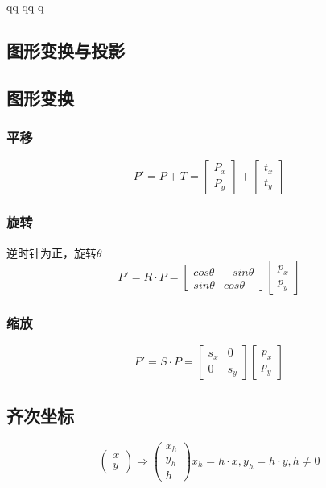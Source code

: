qq	qq	q                                                                                                                                                                                                                                                                                      \documentclass{article}
\begin{document}
\begin{CJK}{UTF8}{gbsn}
	\section{图形变换与投影}
	\subsection{图形变换}
	\subsubsection{平移}
	$$
	P'=P+T=\begin{bmatrix}
	P_x\\
	P_y\end{bmatrix}
	+\begin{bmatrix}
	t_x\\t_y
	\end{bmatrix}
	$$
	\subsubsection{旋转}
	逆时针为正，旋转$\theta$\\
	$$
	P'=R\cdot P=\begin{bmatrix}
	cos\theta&-sin\theta\\sin\theta&cos\theta
	\end{bmatrix}
	\begin{bmatrix}
	p_x\\p_y
	\end{bmatrix}
	$$
	\subsubsection{缩放}
	$$P'=S\cdot P=\begin{bmatrix}
	s_x&0\\0&s_y
	\end{bmatrix}
	\begin{bmatrix}
	p_x\\p_y
	\end{bmatrix}
	$$
	\subsection{齐次坐标}
	$$
	\begin{pmatrix}
		x\\y
	\end{pmatrix}
	\Rightarrow\begin{pmatrix}
		x_h\\y_h\\h
	\end{pmatrix}
	x_h=h\cdot x,y_h=h\cdot y,h\neq 0
	$$

\end{CJK}
\end{document}
